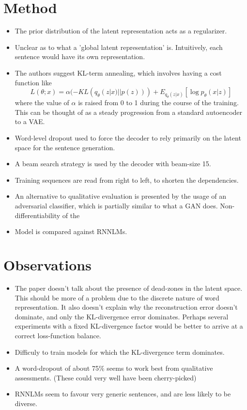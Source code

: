 \documentclass[12pt]{scrartcl}
\begin{document}
\section{Method}
  \begin{itemize}
    \item The prior distribution of the latent representation acts as a regularizer.
    \item Unclear as to what a 'global latent representation' is. Intuitively, each sentence would have its own representation.
    \item The authors suggest KL-term annealing, which involves having a cost function like
    $$L(\theta; x) = \alpha (-KL(q_{\theta}(z|x)||p(z))) + E_{q_{\theta}(z|x)}[\log p_{\theta}(x|z)]$$ where the value of $\alpha$ is raised from 0 to 1 during the course of the training. This can be thought of as a steady progression from a standard autoencoder to a VAE.
    \item Word-level dropout used to force the decoder to rely primarily on the latent space for the sentence generation.
    \item A beam search strategy is used by the decoder with beam-size 15.
    \item Training sequences are read from right to left, to shorten the dependencies.
    \item An alternative to qualitative evaluation is presented by the usage of an adversarial classifier, which is partially similar to what a GAN does. Non-differentiability of the 
    \item Model is compared against RNNLMs. \cite{mikolov2011extensions}
  \end{itemize}

\section{Observations}
  \begin{itemize}
    \item The paper doesn't talk about the presence of dead-zones in the latent space. This should be more of a problem due to the discrete nature of word representation. It also doesn't explain why the reconstruction error doesn't dominate, and only the KL-divergence error dominates. Perhaps several experiments with a fixed KL-divergence factor would be better to arrive at a correct loss-function balance.
    \item Difficuly to train models for which the KL-divergence term dominates.
    \item A word-dropout of about 75\% seems to work best from qualitative assessments. (These could very well have been cherry-picked)
    \item RNNLMs seem to favour very generic sentences, and are less likely to be diverse.
  \end{itemize}



\end{document}
